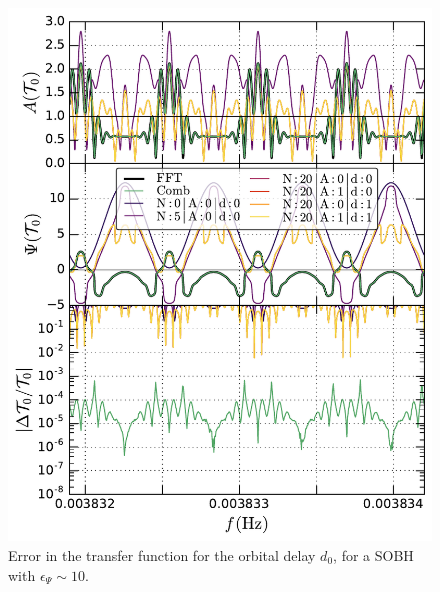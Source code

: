 \documentclass[aps,showpacs,twocolumn,
prd,superscriptaddress,nofootinbib]{revtex4-1}
\begin{document}
\begin{figure}
  \centering
  \includegraphics[width=.98\linewidth]{plots/LISAtransfererrorSOBHepsPsi10d0corr_py.pdf}
  \caption{Error in the transfer function for the orbital delay $d_{0}$, for a SOBH with $\epsilon_{\Psi}\sim 10$.}
  \label{fig:}
\end{figure}
\end{document}
